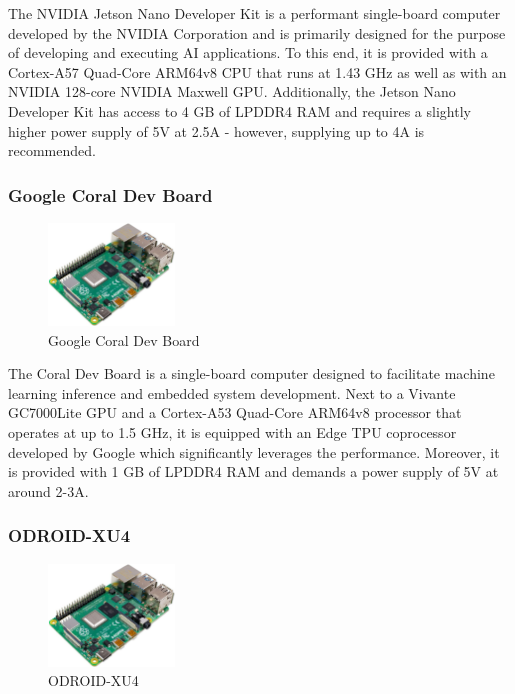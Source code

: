 The NVIDIA Jetson Nano Developer Kit is a performant single-board computer developed by the NVIDIA Corporation and is primarily designed for the purpose of developing and executing AI applications. To this end, it is provided with a Cortex-A57 Quad-Core ARM64v8 CPU that runs at 1.43 GHz as well as with an NVIDIA 128-core NVIDIA Maxwell GPU. Additionally, the Jetson Nano Developer Kit has access to 4 GB of LPDDR4 RAM and requires a slightly higher power supply of 5V at 2.5A - however, supplying up to 4A is recommended.~\parencite{jetson-nano-devkit-manual}

\subsubsection{Google Coral Dev Board}

\begin{figure}[h]
    \centering
    \includegraphics[width=0.30\textwidth]{./figures/mesh}
    \caption{Google Coral Dev Board}
    \label{fig:coral-dev-board}
\end{figure}

The Coral Dev Board is a single-board computer designed to facilitate machine learning inference and embedded system development. Next to a Vivante GC7000Lite GPU and a Cortex-A53 Quad-Core ARM64v8 processor that operates at up to 1.5 GHz, it is equipped with an Edge TPU coprocessor developed by Google which significantly leverages the performance. Moreover, it is provided with 1 GB of LPDDR4 RAM and demands a power supply of 5V at around 2-3A.~\parencite{coral-dev-board-manual}

\subsubsection{ODROID-XU4}

\begin{figure}[h]
    \centering
    \includegraphics[width=0.30\textwidth]{./figures/mesh}
    \caption{ODROID-XU4}
    \label{fig:odroid-xu4}
\end{figure}

